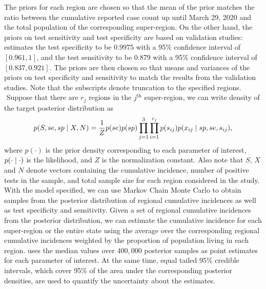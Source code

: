 The priors for each region are chosen so that the mean of the prior matches the ratio between the cumulative reported case count up until March 29, 2020 and the total population of the corresponding super-region. On the other hand, the priors on test sensitivity and test specificity are based on validation studies: \cite{rosenberg2020cumulative} estimates the test specificity to be $0.9975$ with a 95\% confidence interval of $[0.961, 1]$, and the test sensitivity to be $0.879$ with a 95\% confidence interval of $[0.837, 0.921]$. The priors are then chosen so that means and variances of the priors on test specificity and sensitivity to match the results from the validation studies. Note that the subscripts denote truncation to the specified regions.\\
\newline$ $
Suppose that there are $r_j$ regions in the $j^\text{th}$ super-region, we can write density of the target posterior distribution as
\[
p(S, se, sp \mid X, N) = \frac{1}{Z}p(se)p(sp)\prod_{j=1}^3\prod_{i=1}^{r_j} p(s_{ij})p(x_{ij}\mid sp, se, s_{ij}),
\]
where $p(\cdot)$ is the prior density corresponding to each parameter of interest, $p(\cdot \mid \cdot)$ is the likelihood, and $Z$ is the normalization constant. Also note that $S$, $X$ and $N$ denote vectors containing the cumulative incidence, number of positive tests in the sample, and total sample size for each region considered in the study. With the model specified, we can use Markov Chain Monte Carlo to obtain samples from the posterior distribution of regional cumulative incidences as well as test specificity and sensitivity. Given a set of regional cumulative incidences from the posterior distribution, we can estimate the cumulative incidence for each super-region or the entire state using the average over the corresponding regional cumulative incidences weighted by the proportion of population living in each region. \cite{meyer2022adjusting} uses the median values over $400,000$ posterior samples as point estimates for each parameter of interest. At the same time, equal tailed 95\% credible intervals, which cover 95\% of the area under the corresponding posterior densities, are used to quantify the uncertainty about the estimates.
